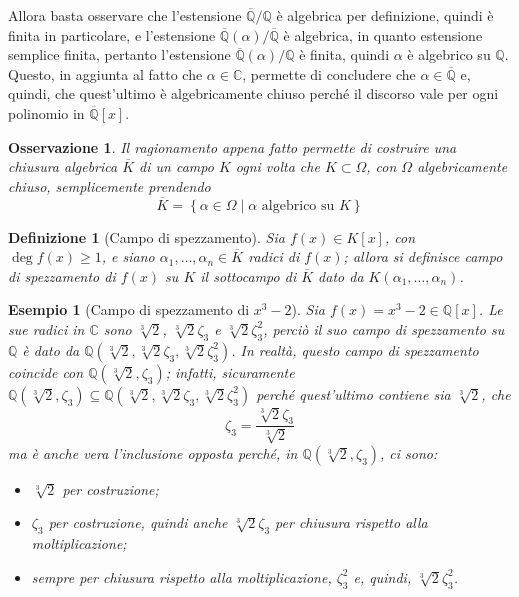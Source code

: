 \documentclass[12pt]{scrartcl}
\theoremstyle{style}
\newtheorem{esempio}{Esempio}[section]
\newtheorem{definizione}{Definizione}[section]
\newtheorem{osservazione}{Osservazione}[section]
\numberwithin{equation}{subsection}
\begin{document}
	Allora basta osservare che l'estensione $\overline{\mathbb{Q}}/\mathbb{Q}$ \`e algebrica per definizione, quindi \`e finita in particolare, e l'estensione $\overline{\mathbb{Q}}(\alpha ) / \overline{\mathbb{Q}}$ \`e algebrica, in quanto estensione semplice finita, pertanto l'estensione $\overline{\mathbb{Q}}(\alpha ) / \mathbb{Q}$ \`e finita, quindi $\alpha $ \`e algebrico su $\mathbb{Q}$.
	Questo, in aggiunta al fatto che $\alpha  \in \mathbb{C}$, permette di concludere che $\alpha  \in \overline{\mathbb{Q}}$ e, quindi, che quest'ultimo \`e algebricamente chiuso perch\'e il discorso vale per ogni polinomio in $\overline{\mathbb{Q}}[x]$.
\begin{osservazione}
Il ragionamento appena fatto permette di costruire una chiusura algebrica $\overline{K}$ di un campo $K$ ogni volta che $K \subset \Omega $, con $\Omega $ algebricamente chiuso, semplicemente prendendo 
\[
\overline{K} = \left\{ \alpha \in \Omega  \mid \alpha \text{ algebrico su } K \right\} 
\] 
\end{osservazione}
\begin{definizione}
	[Campo di spezzamento]
	Sia $f(x) \in K[x]$, con $\deg f(x) \ge 1$, e siano $\alpha _1,\ldots,\alpha _n \in \overline{K}$ radici di $f(x)$; allora si definisce \textit{campo di spezzamento} di $f(x)$ su $K$ il sottocampo di $\overline{K}$ dato da $K(\alpha _1,\ldots,\alpha _n)$.
\end{definizione}
\begin{esempio}
	[Campo di spezzamento di $x^3 - 2$]
	Sia $f(x) = x^3 - 2 \in \mathbb{Q}[x]$. 
	Le sue radici in $\mathbb{C}$ sono $\sqrt[3]{2}$, $ \sqrt[3]{2} \zeta_3$ e $\sqrt[3]{2} \zeta_3^2$, perci\`o il suo campo di spezzamento su $\mathbb{Q}$ \`e dato da $\mathbb{Q}(\sqrt[3]{2},\sqrt[3]{2}\zeta_3,\sqrt[3]{2}\zeta_3^2)$.
	In realt\`a, questo campo di spezzamento coincide con $\mathbb{Q}(\sqrt[3]{2} ,\zeta_3)$; infatti, sicuramente $\mathbb{Q}(\sqrt[3]{2} ,\zeta_3)\subseteq \mathbb{Q}(\sqrt[3]{2} ,\sqrt[3]{2}\zeta_3,\sqrt[3]{2}\zeta_3^2)$ perch\'e quest'ultimo contiene sia $\sqrt[3]{2}$, che
	\[
		\zeta_3 = \frac{\sqrt[3]{2} \zeta_3 }{\sqrt[3]{2} }
	\] 
	ma \`e anche vera l'inclusione opposta perch\'e, in $\mathbb{Q}(\sqrt[3]{2}, \zeta_3) $, ci sono:
	\begin{itemize}
		\item $\sqrt[3]{2} $ per costruzione;
		\item $\zeta_3$ per costruzione, quindi anche $\sqrt[3]{2} \zeta_3 $ per chiusura rispetto alla moltiplicazione;
		\item sempre per chiusura rispetto alla moltiplicazione, $\zeta_3 ^2$ e, quindi, $\sqrt[3]{2} \zeta_3^2$.
	\end{itemize}
\end{esempio}
\end{document}
